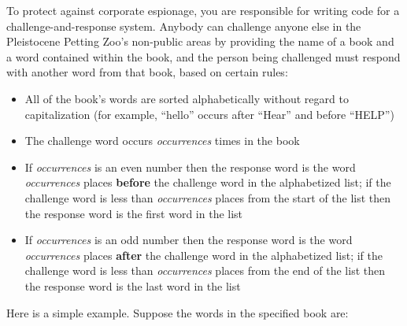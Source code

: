 To protect against corporate espionage, you are responsible for writing code
for a challenge-and-response system. Anybody can challenge anyone else in the
Pleistocene Petting Zoo's non-public areas by providing the name of a book and
a word contained within the book, and the person being challenged must respond
with another word from that book, based on certain rules:
\begin{itemize}
\item All of the book's words are sorted alphabetically without regard to
    capitalization (for example, ``hello'' occurs after ``Hear'' and before
    ``HELP'')
\item The challenge word occurs \textit{occurrences} times in the book
\item If \textit{occurrences} is an even number then the response word is the
    word \textit{occurrences} places \textbf{before} the challenge word in the
    alphabetized list; if the challenge word is less than \textit{occurrences}
    places from the start of the list then the response word is the first word
    in the list
\item If \textit{occurrences} is an odd number then the response word is the
    word \textit{occurrences} places \textbf{after} the challenge word in the
    alphabetized list; if the challenge word is less than \textit{occurrences}
    places from the end of the list then the response word is the last word
    in the list
\end{itemize}

Here is a simple example. Suppose the words in the specified book are:

